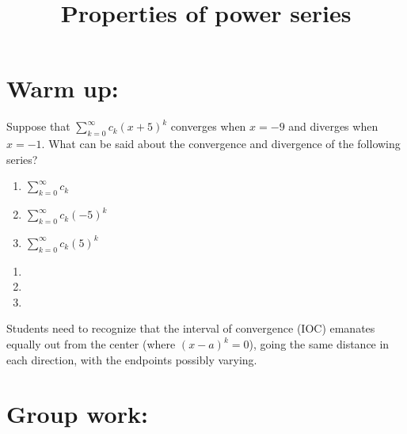 \documentclass[]{ximera}
\title{Properties of power series}
\begin{document}
\begin{abstract}		\end{abstract}
\maketitle



\section{Warm up:}
Suppose that $\sum_{k=0}^\infty c_k (x+5)^k$ converges when $x=-9$ and diverges when $x=-1$.  
What can be said about the convergence and divergence of the following series?
	\begin{multicols}{3}
	\begin{enumerate}
	\item  $\sum_{k=0}^\infty c_k$
	\item  $\sum_{k=0}^\infty c_k (-5)^k$
	\item  $\sum_{k=0}^\infty c_k (5)^k$
	\end{enumerate}
	\end{multicols}
	
	\begin{freeResponse}
	\begin{enumerate}
	\item
	
	\item
	
	\item
	\end{enumerate}
	\end{freeResponse}
	
\begin{instructorNotes}
Students need to recognize that the interval of convergence (IOC) emanates equally out from the center (where $(x-a)^k = 0$), going the same distance in each direction, with the endpoints possibly varying.
\end{instructorNotes}







\section{Group work:}
\end{document}
